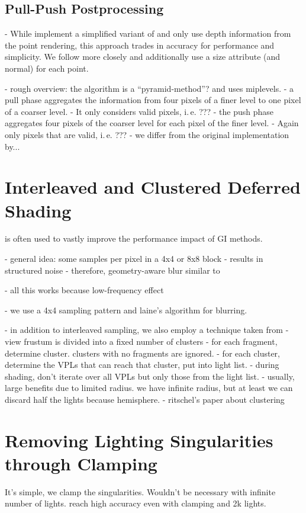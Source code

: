 \subsection{Pull-Push Postprocessing}

- While \citep{ritschel2008ism} implement a simplified variant of \citet{Marroquim:2007:reconstruction} and only use depth information from the point rendering, this approach trades in accuracy for performance and simplicity. We follow \citet{Marroquim:2007:reconstruction} more closely and additionally use a size attribute (and normal) for each point.

- rough overview: the algorithm is a ``pyramid-method''? and uses miplevels.
- a pull phase aggregates the information from four pixels of a finer level to one pixel of a coarser level.
- It only considers valid pixels, i.\,e. ???
- the push phase aggregates four pixels of the coarser level for each pixel of the finer level.
- Again only pixels that are valid, i.\,e. ???
- we differ from the original implementation by...



\section{Interleaved and Clustered Deferred Shading}
\label{sec:interleavedAndClusteredShading}
\citep{Keller:2001:InterleavedSampling} is often used to vastly improve the performance impact of GI methods.

- general idea: some samples per pixel in a 4x4 or 8x8 block
- results in structured noise
- therefore, geometry-aware blur similar to \citet{laine2007incremental}

- all this works because low-frequency effect

- we use a 4x4 sampling pattern and laine's algorithm for blurring.


- in addition to interleaved sampling, we also employ a technique taken from \citet{olsson2012clustered}
- view frustum is divided into a fixed number of clusters
- for each fragment, determine cluster. clusters with no fragments are ignored.
- for each cluster, determine the VPLs that can reach that cluster, put into light list.
- during shading, don't iterate over all VPLs but only those from the light list.
- usually, large benefits due to limited radius. we have infinite radius, but at least we can discard half the lights because hemisphere.
- ritschel's paper about clustering

\section{Removing Lighting Singularities through Clamping}
\label{sec:clamping}
It's simple, we clamp the singularities. Wouldn't be necessary with infinite number of lights. \citet{hedman2016sequential} reach high accuracy even with clamping and 2k lights.
